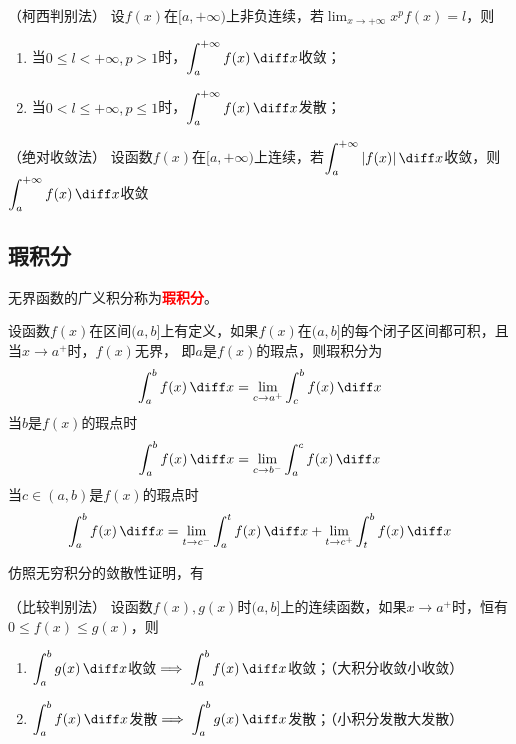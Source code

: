 \begin{theorem}
    （柯西判别法）
    \label{th:无穷积分柯西判别法}
    设$f(x)$在$[a,+\infty)$上非负连续，若$\displaystyle\lim_{x\to+\infty}x^pf(x)=l$，则
    \begin{enumerate}[(1)]
        \item 当$0\leq l < +\infty,p>1$时，$\displaystyle\int_a^{+\infty}f(x)\,\diff x$收敛；
        \item 当$0< l \leq +\infty,p\leq 1$时，$\displaystyle\int_a^{+\infty}f(x)\,\diff x$发散；
    \end{enumerate}
\end{theorem}

\begin{theorem}
    （绝对收敛法）
    \label{th:无穷积分绝对收敛法}
    设函数$f(x)$在$[a,+\infty)$上连续，若$\displaystyle\int_a^{+\infty}|f(x)|\,\diff x$收敛，则$\displaystyle\int_a^{+\infty}f(x)\,\diff x$收敛
\end{theorem}

\subsection{瑕积分}
无界函数的广义积分称为\textcolor{red}{\textsf{\textbf{瑕积分}}}。
\begin{definition}
    设函数$f(x)$在区间$(a,b]$上有定义，如果$f(x)$在$(a,b]$的每个闭子区间都可积，且当$x\to a^+$时，$f(x)$无界，
    即$a$是$f(x)$的瑕点，则瑕积分为
    \[ \int_a^bf(x)\,\diff x = \lim_{c\to a^+}\int_c^bf(x)\,\diff x \]
    当$b$是$f(x)$的瑕点时
    \[ \int_a^b f(x)\,\diff x = \lim_{c\to b^-}\int_a^cf(x)\,\diff x \]
    当$c\in(a,b)$是$f(x)$的瑕点时
    \[ \int_a^b f(x)\,\diff x = \lim_{t\to c^-}\int_a^tf(x)\,\diff x + \lim_{t\to c^+}\int_t^bf(x)\,\diff x \]
\end{definition}

仿照无穷积分的敛散性证明，有
\begin{theorem}
    （比较判别法）
    \label{th:瑕积分比较判别法}
    设函数$f(x),g(x)$时$(a,b]$上的连续函数，如果$x\to a^+$时，恒有$0\leq f(x) \leq g(x)$，则
    \begin{enumerate}[(1)]
        \item $\displaystyle\int_a^b g(x)\,\diff x$收敛$\displaystyle\implies\int_a^bf(x)\,\diff x$收敛；（大积分收敛小收敛）
        \item $\displaystyle\int_a^b f(x)\,\diff x$发散$\displaystyle\implies\int_a^bg(x)\,\diff x$发散；（小积分发散大发散）
    \end{enumerate}
\end{theorem}

